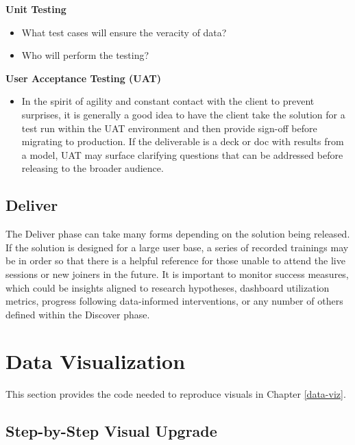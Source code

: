 \documentclass[
]{book}
\providecommand{\tightlist}{%
  \setlength{\itemsep}{0pt}\setlength{\parskip}{0pt}}
\begin{document}
\textbf{Unit Testing}

\begin{itemize}
\tightlist
\item
  What test cases will ensure the veracity of data?
\item
  Who will perform the testing?
\end{itemize}

\textbf{User Acceptance Testing (UAT)}

\begin{itemize}
\tightlist
\item
  In the spirit of agility and constant contact with the client to prevent surprises, it is generally a good idea to have the client take the solution for a test run within the UAT environment and then provide sign-off before migrating to production. If the deliverable is a deck or doc with results from a model, UAT may surface clarifying questions that can be addressed before releasing to the broader audience.
\end{itemize}

\hypertarget{deliver}{%
\subsection{Deliver}\label{deliver}}

The Deliver phase can take many forms depending on the solution being released. If the solution is designed for a large user base, a series of recorded trainings may be in order so that there is a helpful reference for those unable to attend the live sessions or new joiners in the future. It is important to monitor success measures, which could be insights aligned to research hypotheses, dashboard utilization metrics, progress following data-informed interventions, or any number of others defined within the Discover phase.

\hypertarget{data-visualization}{%
\section{Data Visualization}\label{data-visualization}}

This section provides the code needed to reproduce visuals in Chapter \ref{data-viz}.

\hypertarget{step-by-step-visual-upgrade-1}{%
\subsection{Step-by-Step Visual Upgrade}\label{step-by-step-visual-upgrade-1}}
\end{document}
